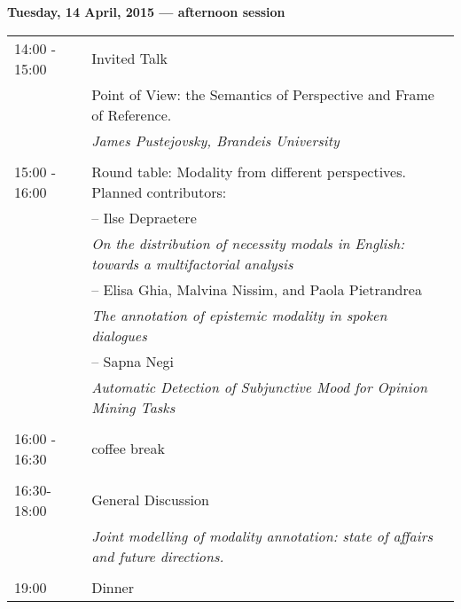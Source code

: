 \documentclass[11pt]{article}
\begin{document}
\textbf{Tuesday, 14 April, 2015 --- afternoon session}

\begin{tabular}{ll}

14:00 - 15:00 & Invited Talk\\ 
& Point of View: the Semantics of Perspective and Frame of Reference. \\
& \textit{James Pustejovsky, Brandeis University}\\

& \\

15:00 - 16:00 & Round table: Modality from different perspectives. Planned contributors:       \\
	& -- Ilse Depraetere \\
	&  \textit{On the distribution of necessity modals in English: towards a multifactorial analysis}\\
	& -- Elisa Ghia, Malvina Nissim, and Paola Pietrandrea  \\ 
	& \textit{The annotation of epistemic modality in spoken dialogues}\\
	& -- Sapna Negi \\
	& \textit{Automatic Detection of Subjunctive Mood for Opinion Mining Tasks}\\

& \\

16:00 - 16:30 & coffee break  \\

& \\

16:30-18:00 & General Discussion\\
& \textit{Joint modelling of modality annotation: state of affairs and future directions.}\\

& \\

19:00 & Dinner  \\

\end{tabular}
\end{document}
